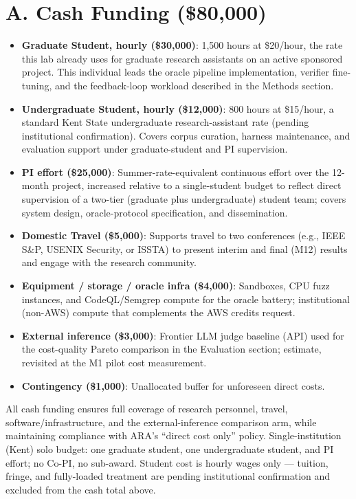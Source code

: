 \documentclass[11pt]{article}
\begin{document}
\section*{A. Cash Funding (\$80,000)}
\begin{itemize}[leftmargin=1.3em, itemsep=0.5ex, topsep=2pt]
\item \textbf{Graduate Student, hourly (\$30,000)}: 1,500 hours at \$20/hour, the rate this lab already uses for graduate research assistants on an active sponsored project. This individual leads the oracle pipeline implementation, verifier fine-tuning, and the feedback-loop workload described in the Methods section.
\item \textbf{Undergraduate Student, hourly (\$12,000)}: 800 hours at \$15/hour, a standard Kent State undergraduate research-assistant rate (pending institutional confirmation). Covers corpus curation, harness maintenance, and evaluation support under graduate-student and PI supervision.
\item \textbf{PI effort (\$25,000)}: Summer-rate-equivalent continuous effort over the 12-month project, increased relative to a single-student budget to reflect direct supervision of a two-tier (graduate plus undergraduate) student team; covers system design, oracle-protocol specification, and dissemination.
\item \textbf{Domestic Travel (\$5,000)}: Supports travel to two conferences (e.g., IEEE S\&P, USENIX Security, or ISSTA) to present interim and final (M12) results and engage with the research community.
\item \textbf{Equipment / storage / oracle infra (\$4,000)}: Sandboxes, CPU fuzz instances, and CodeQL/Semgrep compute for the oracle battery; institutional (non-AWS) compute that complements the AWS credits request.
\item \textbf{External inference (\$3,000)}: Frontier LLM judge baseline (API) used for the cost-quality Pareto comparison in the Evaluation section; estimate, revisited at the M1 pilot cost measurement.
\item \textbf{Contingency (\$1,000)}: Unallocated buffer for unforeseen direct costs.
\end{itemize}

All cash funding ensures full coverage of research personnel, travel, software/infrastructure, and the external-inference comparison arm, while maintaining compliance with ARA's ``direct cost only'' policy. Single-institution (Kent) solo budget: one graduate student, one undergraduate student, and PI effort; no Co-PI, no sub-award. Student cost is hourly wages only --- tuition, fringe, and fully-loaded treatment are pending institutional confirmation and excluded from the cash total above.
\end{document}
